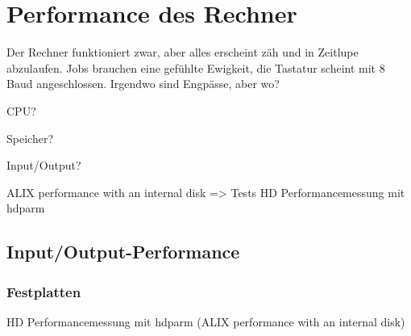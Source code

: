 \chapter{Performance des Rechner}
\label{cha:lokal-performance}

\begin{abstractsec}
  Der Rechner funktioniert zwar, aber alles erscheint zäh und in Zeitlupe
  abzulaufen. Jobs brauchen eine gefühlte Ewigkeit, die Tastatur scheint mit
  8 Baud angeschlossen. Irgendwo sind Engpässe, aber wo?
\end{abstractsec}

\begin{notes}
\item CPU?
\item Speicher?
\item Input/Output?
\item ALIX performance with an internal disk => Tests HD Performancemessung
  mit hdparm
\end{notes}

\section{Input/Output-Performance}
\label{sec:input-output-performance}


\subsection{Festplatten}
\label{sec:performance-festplatten}

\begin{notes}
\item HD Performancemessung mit hdparm (ALIX performance with an
  internal disk)
\end{notes}



